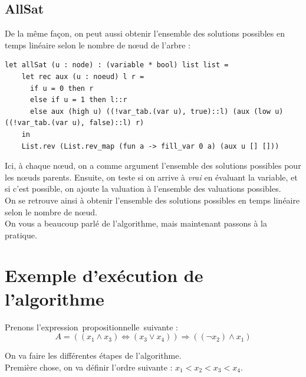 \documentclass[a4paper, oneside]{report}
\newcommand{\expp}{expression~propositionnelle~}
\begin{document}
\subsection{AllSat}

De la même façon, on peut aussi obtenir l'ensemble des solutions possibles en temps linéaire selon le nombre de nœud de l'arbre :
\begin{lstlisting}
let allSat (u : node) : (variable * bool) list list =
    let rec aux (u : noeud) l r =
      if u = 0 then r
      else if u = 1 then l::r
      else aux (high u) ((!var_tab.(var u), true)::l) (aux (low u) ((!var_tab.(var u), false)::l) r)
    in 
    List.rev (List.rev_map (fun a -> fill_var 0 a) (aux u [] []))
\end{lstlisting}
Ici, à chaque nœud, on a comme argument l'ensemble des solutions possibles pour les nœuds parents. Ensuite, on teste si on arrive à \textit{vrai} en évaluant la variable, et si c'est possible, on ajoute la valuation à l'ensemble des valuations possibles.\\
On se retrouve ainsi à obtenir l'ensemble des solutions possibles en temps linéaire selon le nombre de nœud.\\

On vous a beaucoup parlé de l'algorithme, mais maintenant passons à la pratique.

\section{Exemple d'exécution de l'algorithme}

Prenons l'\expp suivante :
$$A = ((x_1 \wedge x_3) \Leftrightarrow (x_3 \vee x_4)) \Rightarrow ((\neg x_2) \wedge x_1)$$

On va faire les différentes étapes de l'algorithme.\\
Première chose, on va définir l'ordre suivante : $x_1 < x_2 < x_3 < x_4$.
\end{document}
